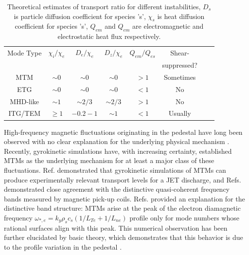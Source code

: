 \documentclass[
 aip,
 amsmath,amssymb,
 reprint
]{revtex4-1}
\begin{document}
\begin{table}[H]
    \centering
    \begin{tabular}{|c|c|c|c|c|c|c|c|}
         \hline
          Mode Type & $\chi_i/\chi_e$ & $D_e/\chi_e$ & $D_z/\chi_e$ & $Q_{em}/Q_{es}$ & Shear-\\&&&&&suppressed? \\
         \hline
          MTM & $\sim 0$ & $\sim0$ & $\sim0$ & $>1$ & Sometimes \\
         \hline
          ETG & $\sim0$ & $\sim0$ & $\sim0$ & $<1$ & No \\
         \hline
          MHD-like & $\sim1$ & $\sim2/3$ & $\sim2/3$ & $>1$ & No\\
         \hline
          ITG/TEM & $\geq 1$ & $-0.2-1$ & $\sim1$ & $<1$ & Usually\\
         \hline
\end{tabular}
\caption[font=5]{Theoretical estimates of transport ratio for different instabilities, $D_s$ is particle diffusion coefficient for species 's', $\chi_s$ is heat diffusion coefficient for species 's', $Q_{em}$ and $Q_{em}$ are electromagnetic and electrostatic heat flux respectively. }
\label{ch:finger}
\end{table}

High-frequency magnetic fluctuations originating in the pedestal have long been observed with no clear explanation for the underlying physical mechanism
\cite{Ahmed_nonlinear, Dominski_nonlinear2, Dominski_nonlinear2,Perez_2003,PhysRevLett.112.115001,doi:10.1063/1.4921148,Laggner_2016,LAGGNER2019479,doi:10.1063/5.0040306,rip,RIP_Chen_POP_2021,MTM_power}.  Recently, gyrokinetic simulations have, with increasing certainty, established MTMs as the underlying mechanism for at least a major class of these fluctuations.  Ref.\cite{Hatch_2016} demonstrated that gyrokinetic simulations of MTMs can produce experimentally relevant transport levels for a JET discharge, and Refs.\cite{Kotschenreuther_2019,Hatch_2021,Ehab_MTM} demonstrated close agreement with the distinctive quasi-coherent frequency bands measured by magnetic pick-up coils.  Refs. \cite{Hatch_2021,Ehab_MTM} provided an explanation for the distinctive band structure: MTMs arise at the peak of the electron diamagnetic frequency $\omega_{*,e}= k_y \rho_s c_s (1/L_{Te}+1/L_{ne})$ profile only for mode numbers whose rational surfaces align with this peak.  This numerical observation has been further elucidated by basic theory, which demonstrates that this behavior is due to the profile variation in the pedestal \cite{Joel_prl,Curie_2022_SLiM}.  %
\end{document}

